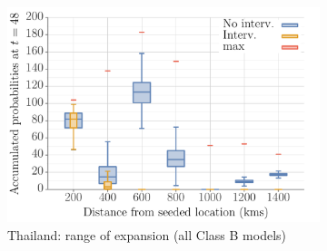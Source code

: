 \documentclass[11pt]{article}
\theoremstyle{definition}
\begin{document}
\begin{figure}[ht]
\begin{subfigure}[b]{.43\textwidth}
\includegraphics[width=\textwidth]{../cellular_automata/results/dist_inf_plots/TH_dist_prob_B_box.pdf}
\caption{Thailand: range of expansion (all Class B models)\label{fig:thlBContourBox}}
\end{subfigure}
\begin{subfigure}[b]{.28\textwidth}

\end{subfigure}
\end{figure}
\end{document}
